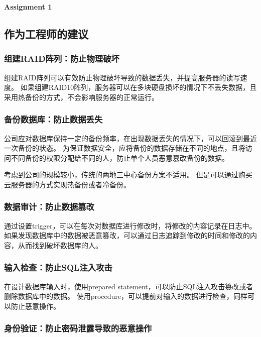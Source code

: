 \documentclass[a4paper,12pt]{ctexart}
\begin{document}
\begin{center}
	{\Large \bf Assignment 1}
\end{center}  

\subsection*{作为工程师的建议}

\subsubsection*{组建RAID阵列：防止物理破坏}

组建RAID阵列可以有效防止物理破坏导致的数据丢失，并提高服务器的读写速度。
如果组建RAID10阵列，服务器可以在多块硬盘损坏的情况下不丢失数据，且采用热备份的方式，不会影响服务器的正常运行。


\subsubsection*{备份数据库：防止数据丢失}

公司应对数据库保持一定的备份频率，在出现数据丢失的情况下，可以回滚到最近一次备份的状态。
为保证数据安全，应将备份的数据存储在不同的地点，且将访问不同备份的权限分配给不同的人，防止单个人员恶意篡改备份的数据。

考虑到公司的规模较小，传统的两地三中心备份方案不适用。
但是可以通过购买云服务器的方式实现热备份或者冷备份。

\subsubsection*{数据审计：防止数据篡改}

通过设置trigger，可以在每次对数据库进行修改时，将修改的内容记录在日志中。
如果发现数据库中的数据被恶意篡改，可以通过日志追踪到修改的时间和修改的内容，从而找到破坏数据库的人。

\subsubsection*{输入检查：防止SQL注入攻击}

在设计数据库输入时，使用prepared statement，可以防止SQL注入攻击篡改或者删除数据库中的数据。
使用procedure，可以提前对输入的数据进行检查，同样可以防止恶意操作。

\subsubsection*{身份验证：防止密码泄露导致的恶意操作}
\end{document}
